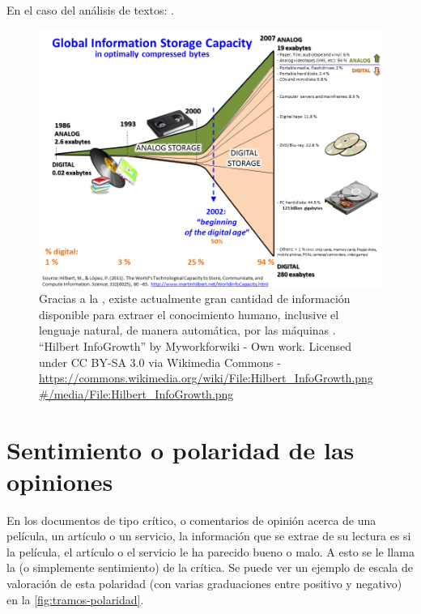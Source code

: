 En el caso del análisis de textos: .

\begin{landscape}
\begin{figure}[htbp]
\centering
\includegraphics[height=0.85\textwidth]{Hilbert-InfoGrowth}
\caption[Explosión de información digital]{Gracias a la , existe actualmente gran cantidad de información disponible para extraer el conocimiento humano, inclusive el lenguaje natural, de manera automática, por las máquinas \citep{Hilbert2011}. \\
{\footnotesize ``Hilbert InfoGrowth'' by Myworkforwiki - Own work. Licensed under CC BY-SA 3.0 via Wikimedia Commons - \url{https://commons.wikimedia.org/wiki/File:Hilbert_InfoGrowth.png\#/media/File:Hilbert_InfoGrowth.png}}}
\label{fig:InfoGrowth}
\end{figure}
\end{landscape}

\section{Sentimiento o polaridad de las opiniones}

En los documentos de tipo crítico, o comentarios de opinión acerca de una película, un artículo o un servicio, la información que se extrae de su lectura es si la película, el artículo o el servicio le ha parecido bueno o malo. A esto se le llama la  (o simplemente sentimiento) de la crítica. Se puede ver un ejemplo de escala de valoración de esta polaridad (con varias graduaciones entre positivo y negativo) en la \autoref{fig:tramos-polaridad}.

